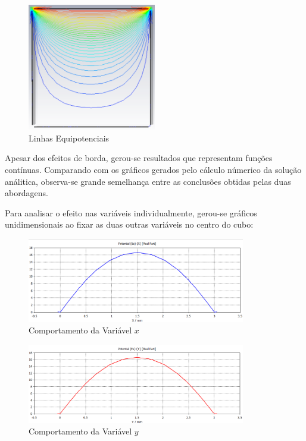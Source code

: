 \documentclass{report}
\begin{document}
\begin{figure}[h!]
  \centering
  \includegraphics[width=0.5\textwidth]{images/plots/simulation_isolines.png}
  \caption{\label{plot:simul_potential_isolines} Linhas Equipotenciais}
\end{figure}

Apesar dos efeitos de borda, gerou-se resultados que representam funções contínuas. Comparando com os gráficos gerados pelo
cálculo númerico da solução análitica, observa-se grande semelhança entre as conclusões obtidas pelas duas abordagens.

Para analisar o efeito nas variáveis individualmente, gerou-se gráficos unidimensionais ao fixar as duas outras variáveis no centro
do cubo:

\begin{figure}[h!]
  \centering
  \includegraphics[width=0.85\textwidth]{images/plots/simulation_potential_x.png}
  \caption{\label{plot:simul_potential_x} Comportamento da Variável $ x $}
\end{figure}

\begin{figure}[h!]
  \centering
  \includegraphics[width=0.85\textwidth]{images/plots/simulation_potential_y.png}
  \caption{\label{plot:simul_potential_y} Comportamento da Variável $ y $}
\end{figure}
\end{document}
